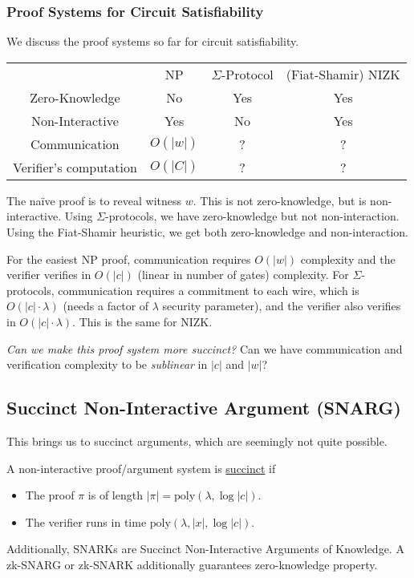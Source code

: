 \subsubsection{Proof Systems for Circuit Satisfiability}
We discuss the proof systems so far for circuit satisfiability.

\begin{center}
    \begin{tabular}{c|c|c|c}
        & NP & $\Sigma$-Protocol & (Fiat-Shamir) NIZK \\
        Zero-Knowledge & No & Yes & Yes\\
        Non-Interactive & Yes & No & Yes\\
        Communication & $O(|w|)$ & ? & ? \\
        Verifier's computation & $O(|C|)$ & ? & ?\\
    \end{tabular}
\end{center}

The na\"ive proof is to reveal witness $w$. This is not zero-knowledge, but is non-interactive. Using $\Sigma$-protocols, we have zero-knowledge but not non-interaction. Using the Fiat-Shamir heuristic, we get both zero-knowledge and non-interaction.

For the easiest \textsf{NP} proof, communication requires $O(|w|)$ complexity and the verifier verifies in $O(|c|)$ (linear in number of gates) complexity. For $\Sigma$-protocols, communication requires a commitment to each wire, which is $O(|c|\cdot \lambda)$ (needs a factor of $\lambda$ security parameter), and the verifier also verifies in $O(|c|\cdot \lambda)$. This is the same for NIZK.

\emph{Can we make this proof system more succinct?} Can we have communication and verification complexity to be \emph{sublinear} in $|c|$ and $|w|$?

\subsection{Succinct Non-Interactive Argument (SNARG)}
This brings us to succinct arguments, which are seemingly not quite possible.
\begin{definition}
    A non-interactive proof/argument system is \ul{succinct} if
    \begin{itemize}
        \item The proof $\pi$ is of length $|\pi| = \mathrm{poly}(\lambda, \log |c|)$.
        \item The verifier runs in time $\mathrm{poly}(\lambda, |x|, \log|c|)$.
    \end{itemize}
\end{definition}
Additionally, SNARKs are Succinct Non-Interactive Arguments of Knowledge. A zk-SNARG or zk-SNARK additionally guarantees zero-knowledge property.

